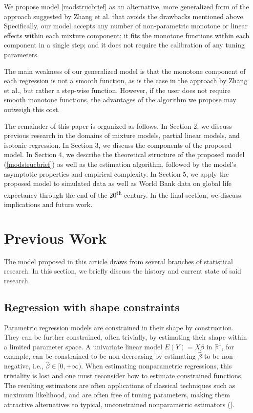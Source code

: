 \documentclass[10pt]{olplainarticle}\usepackage[]{graphicx}\usepackage[]{color}
\begin{document}
We propose model \ref{modstrucbrief} as an alternative, more generalized form of the approach suggested by Zhang et al. that avoids the drawbacks mentioned above. Specifically, our model accepts any number of non-parametric monotone or linear effects within each mixture component; it fits the monotone functions within each component in a single step; and it does not require the calibration of any tuning parameters.

The main weakness of our generalized model is that the monotone component of each regression is not a smooth function, as is the case in the approach by Zhang et al., but rather a step-wise function. However, if the user does not require smooth monotone functions, the advantages of the algorithm we propose may outweigh this cost.

The remainder of this paper is organized as follows. In Section 2, we discuss previous research in the domains of mixture models, partial linear models, and isotonic regression. In Section 3, we discuss the components of the proposed model. In Section 4, we describe the theoretical structure of the proposed model (\ref{modstrucbrief}) as well as the estimation algorithm, followed by the model's asymptotic properties and empirical complexity. In Section 5, we apply the proposed model to simulated data as well as World Bank data on global life expectancy through the end of the 20\textsuperscript{th} century. In the final section, we discuss implications and future work.


\section{Previous Work}

The model proposed in this article draws from several branches of statistical research. In this section, we briefly discuss the history and current state of said research.

\subsection{Regression with shape constraints}

Parametric regression models are constrained in their shape by construction. They can be further constrained, often trivially, by estimating their shape within a limited parameter space. A univariate linear model $E(Y) = X\beta$ in $\mathbb{R}^1$, for example, can be constrained to be non-decreasing by estimating $\hat{\beta}$ to be non-negative, i.e., $\hat{\beta} \in [0,+\infty)$. When estimating nonparametric regressions, this triviality is lost and one must reconsider how to estimate constrained functions. The resulting estimators are often applications of classical techniques such as maximum likelihood, and are often free of tuning parameters, making them attractive alternatives to typical, unconstrained nonparametric estimators (\cite{guntu}).
\end{document}
